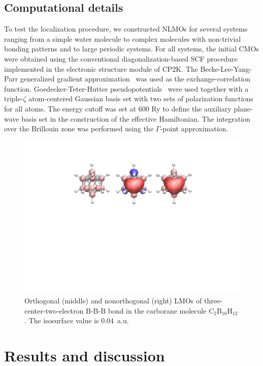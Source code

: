 \documentclass[aps,prl,reprint,amsmath,amssymb]{revtex4-1}
\begin{document}
\subsection{Computational details}

To test the localization procedure, we constructed NLMOs for several systems ranging from a simple water molecule to complex molecules with non-trivial bonding patterns and to large periodic systems. 
For all systems, the initial CMOs were obtained using the conventional diagonalization-based SCF procedure implemented in the electronic structure module of CP2K. 
The Becke-Lee-Yang-Parr generalized gradient approximation~\cite{becke1988density, lee1988development} was used as the exchange-correlation function.
Goedecker-Teter-Hutter pseudopotentials~\cite{goedecker1996separable} were used together with a triple-$\zeta$ atom-centered Gaussian basis set with two sets of polarization functions for all atoms. 
The energy cutoff was set at 600 Ry to define the auxiliary plane-wave basis set in the construction of the effective Hamiltonian. 
The integration over the Brillouin zone was performed using the $\Gamma$-point approximation.
%
\begin{figure}[htb]
\centering
\includegraphics[scale=0.5]{carborane.pdf}
\caption{Orthogonal (middle) and nonorthogonal (right) LMOs of three-center-two-electron B-B-B bond in the carborane molecule C$_2$B$_{10}$H$_{12}$. The isosurface value is 0.04~a.u.}
\label{fig:boro}
\end{figure}
%

\section{Results and discussion}
\end{document}

